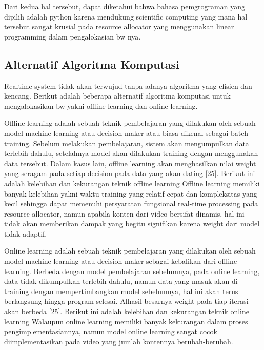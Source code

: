         Dari kedua hal tersebut, dapat diketahui bahwa bahasa pemgrograman yang dipilih adalah python karena mendukung scientific computing
        yang mana hal tersebut sangat krusial pada resource allocator yang menggunakan linear programming dalam pengalokasian bw nya.

    \subsection{Alternatif Algoritma Komputasi}
        Realtime system tidak akan terwujud tanpa adanya algoritma yang efisien dan kencang. Berikut adalah beberapa alternatif algoritma komputasi untuk mengalokasikan bw
        yakni offline learning dan online learning.

        Offline learning adalah sebuah teknik pembelajaran yang dilakukan oleh sebuah model machine
        learning atau decision maker atau biasa dikenal sebagai batch training. Sebelum melakukan
        pembelajaran, sistem akan mengumpulkan data terlebih dahulu, setelahnya model akan
        dilakukan training dengan menggunakan data tersebut. Dalam kasus lain, offline learning akan
        menghasilkan nilai weight yang seragam pada setiap decision pada data yang akan dating [25].
        Berikut ini adalah kelebihan dan kekurangan teknik offline learning
        Offline learning memiliki banyak kelebihan yakni waktu training yang relatif cepat dan
        kompleksitas yang kecil sehingga dapat memenuhi persyaratan fungsional real-time processing
        pada resource allocator, namun apabila konten dari video bersifat dinamis, hal ini tidak akan
        memberikan dampak yang begitu signifikan karena weight dari model tidak adaptif.

        Online learning adalah sebuah teknik pembelajaran yang dilakukan oleh sebuah model machine
        learning atau decision maker sebagai kebalikan dari offline learning. Berbeda dengan model
        pembelajaran sebelumnya, pada online learning, data tidak dikumpulkan terlebih dahulu,
        namun data yang masuk akan di-training dengan mempertimbangkan model sebelumnya, hal
        ini akan terus berlangsung hingga program selesai. Alhasil besarnya weight pada tiap iterasi
        akan berbeda [25]. Berikut ini adalah kelebihan dan kekurangan teknik online learning
        Walaupun online learning memiliki banyak kekurangan dalam proses pengimplementasiannya,
        namun model online learning sangat cocok diimplementasikan pada video yang jumlah
        kontennya berubah-berubah.

